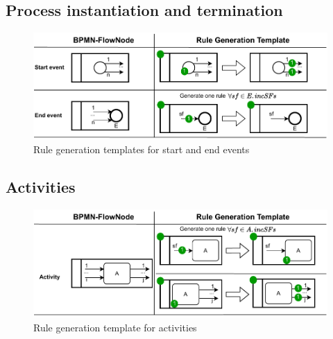 \documentclass[submission, copyright, creativecommons]{eptcs}
\begin{document}
\subsection{Process instantiation and termination}
\begin{figure}[h]
    \centering
    \includegraphics[width=1\textwidth]{images/start_end_template.pdf}
    \caption{Rule generation templates for start and end events}
    \label{fig:StartAndEndTemplate}
\end{figure}
\subsection{Activities}
\begin{figure}[h]
    \centering
    \includegraphics[width=1\textwidth]{images/activities_template.pdf}
    \caption{Rule generation template for activities}
    \label{fig:ActivityTemplates}
\end{figure}
\end{document}
